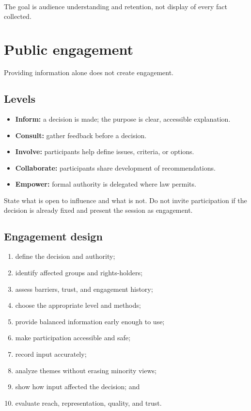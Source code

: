 \documentclass[11pt,letterpaper,oneside,openany]{book}
\begin{document}
The goal is audience understanding and retention, not display of every fact collected.


\section[Public engagement]{Public engagement}
Providing information alone does not create engagement.


\subsection[Levels]{Levels}
\begin{itemize}
\item \textbf{Inform:} a decision is made; the purpose is clear, accessible explanation.
\item \textbf{Consult:} gather feedback before a decision.
\item \textbf{Involve:} participants help define issues, criteria, or options.
\item \textbf{Collaborate:} participants share development of recommendations.
\item \textbf{Empower:} formal authority is delegated where law permits.
\end{itemize}


State what is open to influence and what is not. Do not invite participation if the decision is already fixed and present the session as engagement.


\subsection[Engagement design]{Engagement design}
\begin{enumerate}
\item define the decision and authority;
\item identify affected groups and rights-holders;
\item assess barriers, trust, and engagement history;
\item choose the appropriate level and methods;
\item provide balanced information early enough to use;
\item make participation accessible and safe;
\item record input accurately;
\item analyze themes without erasing minority views;
\item show how input affected the decision; and
\item evaluate reach, representation, quality, and trust.
\end{enumerate}
\end{document}
